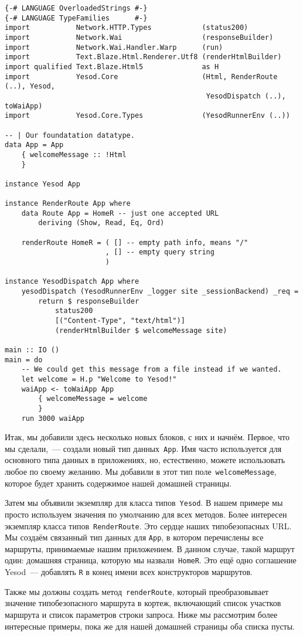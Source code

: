 \begin{lstlisting}
{-# LANGUAGE OverloadedStrings #-}
{-# LANGUAGE TypeFamilies      #-}
import           Network.HTTP.Types            (status200)
import           Network.Wai                   (responseBuilder)
import           Network.Wai.Handler.Warp      (run)
import           Text.Blaze.Html.Renderer.Utf8 (renderHtmlBuilder)
import qualified Text.Blaze.Html5              as H
import           Yesod.Core                    (Html, RenderRoute (..), Yesod,
                                                YesodDispatch (..), toWaiApp)
import           Yesod.Core.Types              (YesodRunnerEnv (..))

-- | Our foundatation datatype.
data App = App
    { welcomeMessage :: !Html
    }

instance Yesod App

instance RenderRoute App where
    data Route App = HomeR -- just one accepted URL
        deriving (Show, Read, Eq, Ord)

    renderRoute HomeR = ( [] -- empty path info, means "/"
                        , [] -- empty query string
                        )

instance YesodDispatch App where
    yesodDispatch (YesodRunnerEnv _logger site _sessionBackend) _req =
        return $ responseBuilder
            status200
            [("Content-Type", "text/html")]
            (renderHtmlBuilder $ welcomeMessage site)

main :: IO ()
main = do
    -- We could get this message from a file instead if we wanted.
    let welcome = H.p "Welcome to Yesod!"
    waiApp <- toWaiApp App
        { welcomeMessage = welcome
        }
    run 3000 waiApp
\end{lstlisting}

Итак, мы добавили здесь несколько новых блоков, с них и начнём. Первое, что мы
сделали,~--- создали новый тип данных~\lstinline'App'. Имя часто используется
для основного типа данных в приложениях, но, естественно, можете использовать
любое по своему желанию. Мы добавили в этот тип
поле~\lstinline'welcomeMessage', которое будет хранить содержимое нашей
домашней страницы.

Затем мы объявили экземпляр для класса типов~\lstinline'Yesod'. В нашем примере
мы просто используем значения по умолчанию для всех методов. Более интересен
экземпляр класса типов~\lstinline'RenderRoute'. Это сердце наших типобезопасных
URL. Мы создаём связанный тип данных для \lstinline'App', в котором перечислены
все маршруты, принимаемые нашим приложением. В данном случае, такой маршрут
один: домашняя страница, которую мы назвали~\lstinline'HomeR'. Это ещё одно
соглашение Yesod~--- добавлять \lstinline'R' в конец имени всех конструкторов
маршрутов.

Также мы должны создать метод~\lstinline'renderRoute', который преобразовывает
значение типобезопасного маршрута в кортеж, включающий список участков маршрута
и список параметров строки запроса. Ниже мы рассмотрим более интересные
примеры, пока же для нашей домашней страницы оба списка пусты.
